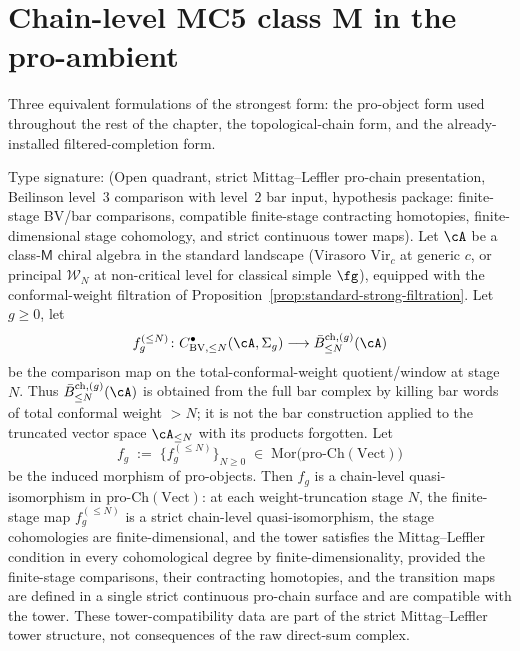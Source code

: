 \section{Chain-level MC5 class M in the pro-ambient}
\label{sec:mc5-platonic-theorem}

Three equivalent formulations of the strongest form: the
pro-object form used throughout the rest of the chapter, the
topological-chain form, and the already-installed filtered-completion
form.

\begin{theorem}
\label{thm:mc5-class-m-chain-level-pro-ambient}
\ClaimStatusProvedHere
{}
Type signature: \textup{(}Open quadrant, strict Mittag--Leffler
pro-chain presentation, Beilinson level~$3$ comparison with level~$2$
bar input, hypothesis package: finite-stage BV/bar comparisons,
compatible finite-stage contracting homotopies, finite-dimensional
stage cohomology, and strict continuous tower maps\textup{)}.
Let $\cA$ be a class-$\mathsf{M}$ chiral algebra in the standard landscape
\textup{(}Virasoro $\mathrm{Vir}_c$ at generic $c$, or principal
$\mathcal{W}_N$ at non-critical level for classical simple $\fg$\textup{)},
equipped with the conformal-weight filtration of
Proposition~\textup{\ref{prop:standard-strong-filtration}}. Let $g \geq 0$,
let
\[
f_g^{(\leq N)} \colon
C^{\bullet}_{\mathrm{BV},\leq N}(\cA, \Sigma_g)
\longrightarrow
\bar B^{\mathrm{ch}, (g)}_{\leq N}(\cA)
\]
be the comparison map on the total-conformal-weight quotient/window at
stage $N$. Thus $\bar B^{\mathrm{ch}, (g)}_{\leq N}(\cA)$ is obtained
from the full bar complex by killing bar words of total conformal
weight \(>N\); it is not the bar construction applied to the truncated
vector space $\cA_{\leq N}$ with its products forgotten. Let
\[
f_g \;:=\; \{f_g^{(\leq N)}\}_{N \geq 0}
\;\in\;
\mathrm{Mor}\bigl(\mathrm{pro}\text{-}\mathrm{Ch}(\mathrm{Vect})\bigr)
\]
be the induced morphism of pro-objects. Then $f_g$ is a chain-level
quasi-isomorphism in $\mathrm{pro}\text{-}\mathrm{Ch}(\mathrm{Vect})$:
at each weight-truncation stage $N$, the finite-stage map $f_g^{(\leq N)}$
is a strict chain-level quasi-isomorphism, the stage cohomologies are
finite-dimensional, and the tower satisfies the Mittag--Leffler
condition in every cohomological degree by finite-dimensionality, provided
the finite-stage comparisons, their contracting homotopies, and the
transition maps are defined in a single strict continuous pro-chain
surface and are compatible with the tower. These tower-compatibility
data are part of the strict Mittag--Leffler tower structure, not
consequences of the raw direct-sum complex.
\end{theorem}


